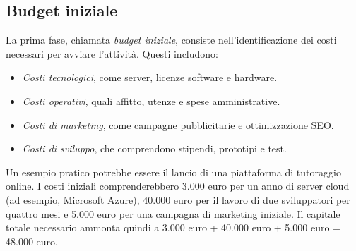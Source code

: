 \subsection{Budget iniziale}
La prima fase, chiamata \textit{budget iniziale}, consiste nell’identificazione dei costi necessari per avviare l’attività. Questi includono:
\begin{itemize}
    \item \textit{Costi tecnologici}, come server, licenze software e hardware.
    \item \textit{Costi operativi}, quali affitto, utenze e spese amministrative.
    \item \textit{Costi di marketing}, come campagne pubblicitarie e ottimizzazione SEO.
    \item \textit{Costi di sviluppo}, che comprendono stipendi, prototipi e test.
\end{itemize}
Un esempio pratico potrebbe essere il lancio di una piattaforma di tutoraggio online. I costi iniziali comprenderebbero 3.000 euro per un anno di server cloud (ad esempio, Microsoft Azure), 40.000 euro per il lavoro di due sviluppatori per quattro mesi e 5.000 euro per una campagna di marketing iniziale. Il capitale totale necessario ammonta quindi a 3.000 euro + 40.000 euro + 5.000 euro = 48.000 euro.

